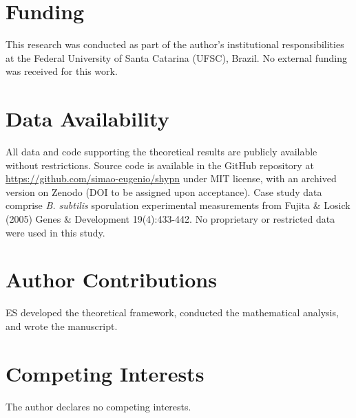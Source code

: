 \documentclass[10pt,letterpaper]{article}
\begin{document}
\section*{Funding}

This research was conducted as part of the author's institutional responsibilities at the Federal University of Santa Catarina (UFSC), Brazil. No external funding was received for this work.

\section*{Data Availability}

All data and code supporting the theoretical results are publicly available without restrictions. Source code is available in the GitHub repository at \url{https://github.com/simao-eugenio/shypn} under MIT license, with an archived version on Zenodo (DOI to be assigned upon acceptance). Case study data comprise \textit{B. subtilis} sporulation experimental measurements from Fujita \& Losick (2005) Genes \& Development 19(4):433-442. No proprietary or restricted data were used in this study.

\section*{Author Contributions}

ES developed the theoretical framework, conducted the mathematical analysis, and wrote the manuscript.

\section*{Competing Interests}

The author declares no competing interests.



\end{document}
